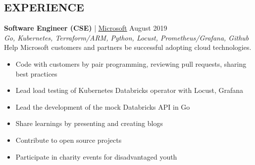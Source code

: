 \documentclass[margin, 10pt, hidelinks]{res} %
\newcommand{\emphasize}{\bf} %
\begin{document}
\begin{resume}






\section{EXPERIENCE}

{\emphasize Software Engineer (CSE)} | \href{https://www.microsoft.com/}{\underline{Microsoft}}    \hfill August 2019  \\
{\it Go, Kubernetes, Terraform/ARM, Python, Locust, Prometheus/Grafana, Github} \\ %
Help Microsoft customers and partners be successful adopting cloud technologies.
\begin{itemize} \setlength{\itemindent}{-0.1in}\itemsep 0pt %
\item Code with customers by pair programming, reviewing pull requests, sharing best practices
\item Lead load testing of Kubernetes Databricks operator with Locust, Grafana
\item Lead the development of the mock Databricks API in Go
\item Share learnings by presenting and creating blogs
\item Contribute to open source projects
\item Participate in charity events for disadvantaged youth
\end{itemize}


\end{resume}
\end{document}
